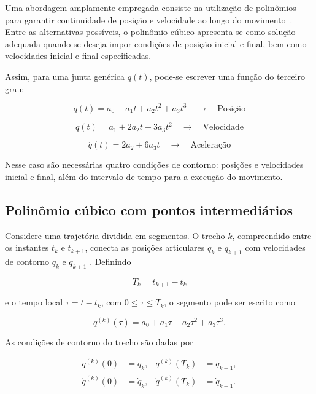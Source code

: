 Uma abordagem amplamente empregada consiste na utilização de polinômios para garantir continuidade de posição e velocidade ao longo do movimento~\cite{craig2005,siciliano2009}. Entre as alternativas possíveis, o polinômio cúbico apresenta-se como solução adequada quando se deseja impor condições de posição inicial e final, bem como velocidades inicial e final especificadas.

Assim, para uma junta genérica $q(t)$, pode-se escrever uma função do terceiro grau:

\begin{equation}
q(t) = a_0 + a_1 t + a_2 t^2 + a_3 t^3 
\quad \longrightarrow \quad \text{Posição}
\end{equation}

\begin{equation}
\dot{q}(t) = a_1 + 2a_2 t + 3a_3 t^2 
\quad \longrightarrow \quad \text{Velocidade}
\end{equation}

\begin{equation}
\ddot{q}(t) = 2a_2 + 6a_3 t 
\quad \longrightarrow \quad \text{Aceleração}
\end{equation}

Nesse caso são necessárias quatro condições de contorno: posições e velocidades inicial e final, além do intervalo de tempo para a execução do movimento.

\subsection{Polinômio cúbico com pontos intermediários}

Considere uma trajetória dividida em segmentos. O trecho $k$, compreendido entre os instantes $t_k$ e $t_{k+1}$, conecta as posições articulares $q_k$ e $q_{k+1}$ com velocidades de contorno $\dot{q}_k$ e $\dot{q}_{k+1}$ \cite{romano2024_parte6}. Definindo

\begin{equation}
T_k = t_{k+1}-t_k
\end{equation}

e o tempo local $\tau=t-t_k$, com $0\leq\tau\leq T_k$, o segmento pode ser escrito como

\begin{equation}
q^{(k)}(\tau)=a_0+a_1\tau+a_2\tau^2+a_3\tau^3.
\end{equation}

As condições de contorno do trecho são dadas por

\begin{align}
q^{(k)}(0) &= q_k, & q^{(k)}(T_k) &= q_{k+1}, \\
\dot{q}^{(k)}(0) &= \dot{q}_k, & \dot{q}^{(k)}(T_k) &= \dot{q}_{k+1}.
\end{align}

